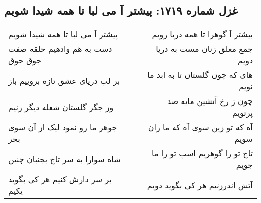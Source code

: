 \begin{center}
\section*{غزل شماره ۱۷۱۹: پیشتر آ می لبا تا همه شیدا شویم}
\label{sec:1719}
\begin{longtable}{l p{0.5cm} r}
پیشتر آ می لبا تا همه شیدا شویم
&&
بیشتر آ گوهرا تا همه دریا رویم
\\
دست به هم وادهیم حلقه صفت جوق جوق
&&
جمع معلق زنان مست به دریا دویم
\\
بر لب دریای عشق تازه بروییم باز
&&
های که چون گلستان تا به ابد ما نویم
\\
وز جگر گلستان شعله دیگر زنیم
&&
چون ز رخ آتشین مایه صد پرتویم
\\
جوهر ما رو نمود لیک از آن سوی بحر
&&
آه که تو زین سوی آه که ما زان سویم
\\
شاه سوارا به سر تاج بجنبان چنین
&&
تاج تو را گوهریم اسپ تو را ما جویم
\\
بر سر دارش کنیم هر کی بگوید یکیم
&&
آتش اندرزنیم هر کی بگوید دویم
\\
\end{longtable}
\end{center}
